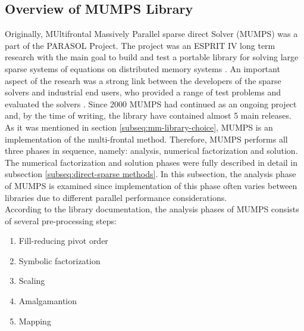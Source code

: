 \subsection{Overview of MUMPS Library}
\label{subseq:mumps-review}

Originally, MUltifrontal Massively Parallel sparse direct Solver (MUMPS) was a part of the PARASOL Project. The project was an ESPRIT IV long term research with the main goal to build and test a portable library for solving large sparse systems of equations on distributed memory systems \cite{PARASOL}. An important aspect of the researh was a strong link between the developers of the sparse solvers and industrial end users, who provided a range of test problems and evaluated the solvers \cite{MUMPS:description}. Since 2000 MUMPS had continued as an ongoing project and, by the time of writing, the library have contained almost 5 main releases.\\



As it was mentioned in section \ref{subseq:mm-library-choice}, MUMPS is an implementation of the multi-frontal method. Therefore, MUMPS performs all three phases in sequence, namely: analysis, numerical factorization and solution. The numerical factorization and solution phases were fully described in detail in subsection \ref{subseq:direct-sparse methods}. In this subsection, the analysis phase of MUMPS is examined since implementation of this phase often varies between libraries due to different parallel performance considerations.\\


According to the library documentation, the analysis phases of MUMPS consists of several pre-processing steps:

\begin{enumerate}
  \item Fill-reducing pivot order \label{mumps:analysis-steps:1}
  \item Symbolic factorization \label{mumps:analysis-steps:2}
  \item Scaling \label{mumps:analysis-steps:3}
  \item Amalgamantion \label{mumps:analysis-steps:4}
  \item Mapping \label{mumps:analysis-steps:5}
\end{enumerate}


